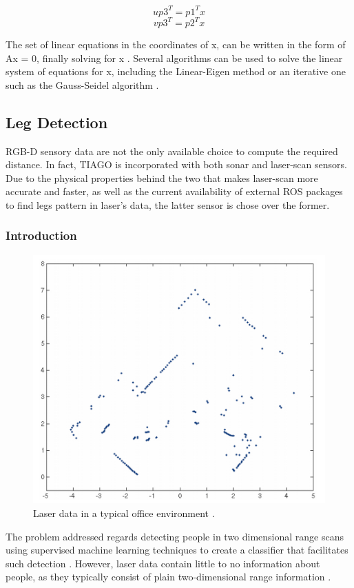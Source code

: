 \[up3^T = p1^Tx\]
\[vp3^T = p2^Tx\]

The set of linear equations in the coordinates of x, can be written in the form of Ax = 0, finally solving for x \cite{hartley1997triangulation}. Several algorithms can be used to solve the linear system of equations for x, including the Linear-Eigen method or an iterative one such as the Gauss-Seidel algorithm \cite{hartley1997triangulation}.

\subsection{Leg Detection}

RGB-D sensory data are not the only available choice to compute the required distance. In fact, TIAGO is incorporated with both sonar and laser-scan sensors. Due to the physical properties behind the two that makes laser-scan more accurate and faster, as well as the current availability of external ROS packages to find legs pattern in laser's data, the latter sensor is chose over the former.

\subsubsection{Introduction}

\begin{figure}[H]
\begin{center}
\includegraphics[width=.4\linewidth]{images/laser-data.png}
\end{center}
\caption{Laser data in a typical office environment \cite{arras2007using}.}
\label{figːlaser_data}
\end{figure}

The problem addressed regards detecting people in two dimensional range scans using supervised machine learning techniques to create a classifier that facilitates such detection \cite{arras2007using}. However, laser data contain little to no information about people, as they typically consist of plain two-dimensional range information \cite{arras2007using}.

